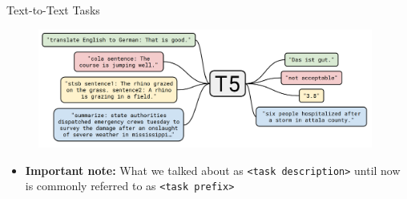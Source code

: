 \begin{frame}{Text-to-Text Tasks}

\vfill
	
	\begin{figure}
		\centering
		\includegraphics[width = 11cm]{figure/t5.png}\\ 
	\end{figure}
	
\begin{itemize}
	\item \textbf{Important note:} What we talked about as \texttt{<task description>} until now is commonly referred to as \texttt{<task prefix>}
\end{itemize}
	
\vfill

\end{frame}


\endlecture

